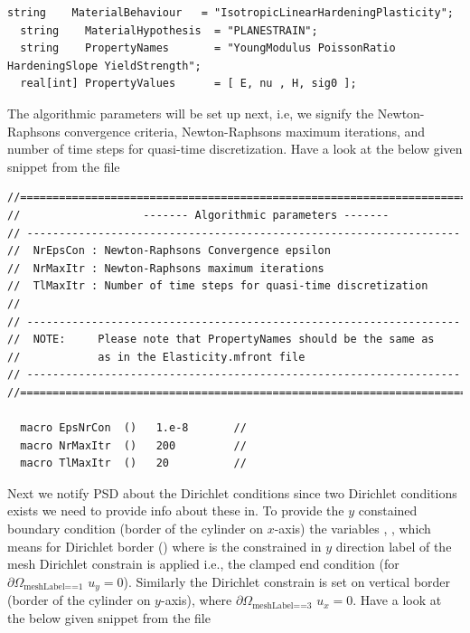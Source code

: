 \begin{lstlisting}[style=CppStyle]
  string    MaterialBehaviour   = "IsotropicLinearHardeningPlasticity";     
  string    MaterialHypothesis  = "PLANESTRAIN";                 
  string    PropertyNames       = "YoungModulus PoissonRatio HardeningSlope YieldStrength";
  real[int] PropertyValues      = [ E, nu , H, sig0 ];
\end{lstlisting}

The algorithmic parameters will be set up next, i.e, we signify the
Newton-Raphsons convergence criteria, Newton-Raphsons maximum
iterations, and number of time steps for quasi-time discretization. Have
a look at the below given snippet from the file

\begin{lstlisting}[style=CppStyle]
//============================================================================
//                   ------- Algorithmic parameters -------                   
// -------------------------------------------------------------------        
//  NrEpsCon : Newton-Raphsons Convergence epsilon                            
//  NrMaxItr : Newton-Raphsons maximum iterations                             
//  TlMaxItr : Number of time steps for quasi-time discretization             
//                                                                            
// -------------------------------------------------------------------        
//  NOTE:     Please note that PropertyNames should be the same as            
//            as in the Elasticity.mfront file                                
// -------------------------------------------------------------------        
//============================================================================
                                                                              
  macro EpsNrCon  ()   1.e-8       //                                         
  macro NrMaxItr  ()   200         //                                         
  macro TlMaxItr  ()   20          // 
\end{lstlisting}

Next we notify PSD about the Dirichlet conditions since two Dirichlet
conditions exists we need to provide info about these in. To provide the
\(y\) constained boundary condition (border of the cylinder on
\(x\)-axis) the variables , , which means
for Dirichlet border  () where  is the
constrained in \(y\) direction label of the mesh Dirichlet constrain is
applied  i.e., the clamped end condition (for
\(\partial\Omega_{\text{meshLabel==1}}\) \(u_y=0\)). Similarly the
Dirichlet constrain is set on vertical border (border of the cylinder on
\(y\)-axis), where \(\partial\Omega_{\text{meshLabel==3}}\) \(u_x=0\).
Have a look at the below given snippet from the file


